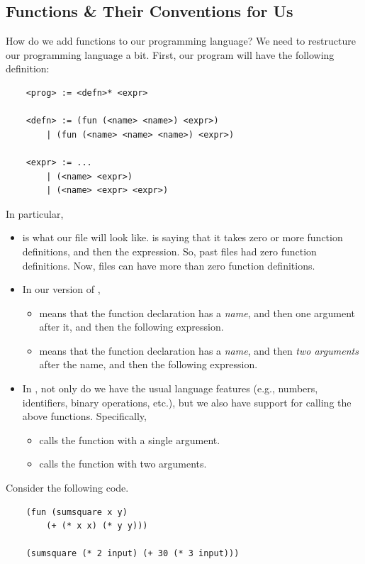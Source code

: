 \subsection{Functions \& Their Conventions for Us}
How do we add functions to our programming language? We need to restructure our programming language a bit. First, our program will have the following definition: 
\begin{verbatim}
    <prog> := <defn>* <expr>

    <defn> := (fun (<name> <name>) <expr>)
        | (fun (<name> <name> <name>) <expr>)

    <expr> := ... 
        | (<name> <expr>) 
        | (<name> <expr> <expr>)\end{verbatim}
In particular, 
\begin{itemize}
    \item {} is what our  file will look like.  is saying that it takes zero or more function definitions, and then the expression. So, past  files had zero function definitions. Now,  files can have more than zero function definitions.
    \item In our version of , 
    \begin{itemize}
        \item {} means that the function declaration has a \emph{name}, and then one argument after it, and then the following expression. 
        \item {} means that the function declaration has a \emph{name}, and then \emph{two arguments} after the name, and then the following expression.
    \end{itemize}
    \item In , not only do we have the usual language features (e.g., numbers, identifiers, binary operations, etc.), but we also have support for calling the above functions. Specifically,
    \begin{itemize}
        \item {} calls the function  with a single argument.
        \item {} calls the function  with two arguments.
    \end{itemize}
\end{itemize}
Consider the following code. 
    \begin{verbatim}
    (fun (sumsquare x y)
        (+ (* x x) (* y y)))

    (sumsquare (* 2 input) (+ 30 (* 3 input)))\end{verbatim}
